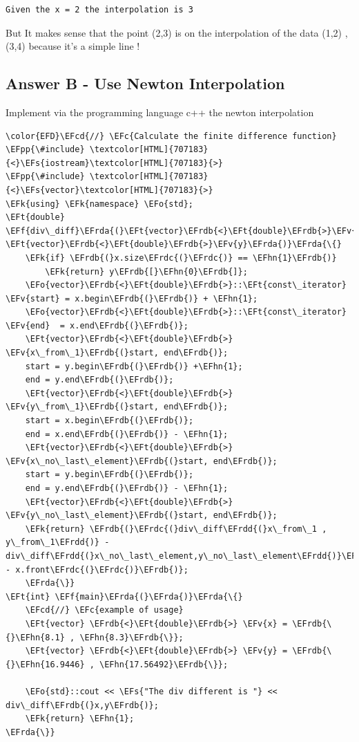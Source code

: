 \documentclass[11pt]{article}
\newcommand{\EFc}[1]{\textcolor{EFc}{#1}} %
\newcommand{\EFcd}[1]{\textcolor{EFcd}{#1}} %
\newcommand{\EFs}[1]{\textcolor{EFs}{#1}} %
\newcommand{\EFk}[1]{\textcolor{EFk}{#1}} %
\newcommand{\EFf}[1]{\textcolor{EFf}{#1}} %
\newcommand{\EFv}[1]{\textcolor{EFv}{#1}} %
\newcommand{\EFt}[1]{\textcolor{EFt}{#1}} %
\newcommand{\EFo}[1]{\textcolor{EFo}{#1}} %
\newcommand{\EFpp}[1]{\textcolor{EFpp}{#1}} %
\newcommand{\EFhn}[1]{\textcolor{EFhn}{#1}} %
\newcommand{\EFrda}[1]{\textcolor{EFrda}{#1}} %
\newcommand{\EFrdb}[1]{\textcolor{EFrdb}{#1}} %
\newcommand{\EFrdc}[1]{\textcolor{EFrdc}{#1}} %
\newcommand{\EFrdd}[1]{\textcolor{EFrdd}{#1}} %
\begin{document}
\begin{verbatim}
Given the x = 2 the interpolation is 3
\end{verbatim}


But It makes sense that the point (2,3) is on the interpolation of the data (1,2) , (3,4)
because it's a simple line !
\subsection{Answer B - Use Newton Interpolation}
\label{sec:org0abc4cc}
Implement via the programming language c++ the newton interpolation

\begin{Code}
\begin{Verbatim}
\color{EFD}\EFcd{//} \EFc{Calculate the finite difference function}
\EFpp{\#include} \textcolor[HTML]{707183}{<}\EFs{iostream}\textcolor[HTML]{707183}{>}
\EFpp{\#include} \textcolor[HTML]{707183}{<}\EFs{vector}\textcolor[HTML]{707183}{>}
\EFk{using} \EFk{namespace} \EFo{std};
\EFt{double} \EFf{div\_diff}\EFrda{(}\EFt{vector}\EFrdb{<}\EFt{double}\EFrdb{>}\EFv{x}, \EFt{vector}\EFrdb{<}\EFt{double}\EFrdb{>}\EFv{y}\EFrda{)}\EFrda{\{}
    \EFk{if} \EFrdb{(}x.size\EFrdc{(}\EFrdc{)} == \EFhn{1}\EFrdb{)}
        \EFk{return} y\EFrdb{[}\EFhn{0}\EFrdb{]};
    \EFo{vector}\EFrdb{<}\EFt{double}\EFrdb{>}::\EFt{const\_iterator} \EFv{start} = x.begin\EFrdb{(}\EFrdb{)} + \EFhn{1};
    \EFo{vector}\EFrdb{<}\EFt{double}\EFrdb{>}::\EFt{const\_iterator} \EFv{end}  = x.end\EFrdb{(}\EFrdb{)};
    \EFt{vector}\EFrdb{<}\EFt{double}\EFrdb{>} \EFv{x\_from\_1}\EFrdb{(}start, end\EFrdb{)};
    start = y.begin\EFrdb{(}\EFrdb{)} +\EFhn{1};
    end = y.end\EFrdb{(}\EFrdb{)};
    \EFt{vector}\EFrdb{<}\EFt{double}\EFrdb{>} \EFv{y\_from\_1}\EFrdb{(}start, end\EFrdb{)};
    start = x.begin\EFrdb{(}\EFrdb{)};
    end = x.end\EFrdb{(}\EFrdb{)} - \EFhn{1};
    \EFt{vector}\EFrdb{<}\EFt{double}\EFrdb{>} \EFv{x\_no\_last\_element}\EFrdb{(}start, end\EFrdb{)};
    start = y.begin\EFrdb{(}\EFrdb{)};
    end = y.end\EFrdb{(}\EFrdb{)} - \EFhn{1};
    \EFt{vector}\EFrdb{<}\EFt{double}\EFrdb{>} \EFv{y\_no\_last\_element}\EFrdb{(}start, end\EFrdb{)};
    \EFk{return} \EFrdb{(}\EFrdc{(}div\_diff\EFrdd{(}x\_from\_1 , y\_from\_1\EFrdd{)} - div\_diff\EFrdd{(}x\_no\_last\_element,y\_no\_last\_element\EFrdd{)}\EFrdc{)}\EFrdb{)}/\EFrdb{(}x.back\EFrdc{(}\EFrdc{)} - x.front\EFrdc{(}\EFrdc{)}\EFrdb{)};
    \EFrda{\}}
\EFt{int} \EFf{main}\EFrda{(}\EFrda{)}\EFrda{\{}
    \EFcd{//} \EFc{example of usage}
    \EFt{vector} \EFrdb{<}\EFt{double}\EFrdb{>} \EFv{x} = \EFrdb{\{}\EFhn{8.1} , \EFhn{8.3}\EFrdb{\}};
    \EFt{vector} \EFrdb{<}\EFt{double}\EFrdb{>} \EFv{y} = \EFrdb{\{}\EFhn{16.9446} , \EFhn{17.56492}\EFrdb{\}};

    \EFo{std}::cout << \EFs{"The div different is "} << div\_diff\EFrdb{(}x,y\EFrdb{)};
    \EFk{return} \EFhn{1};
\EFrda{\}}
\end{Verbatim}
\end{Code}
\end{document}
